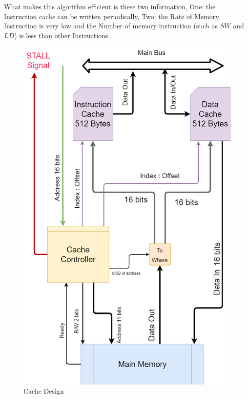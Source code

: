     \vspace{1cm}
    What makes this algorithm efficient is these two information, One: the Instruction cache
    can be written periodically, Two: the Rate of Memory Instruction is very low and the Number
    of memory instruction (such as $SW$ and $LD$) is less than other Instructions.

    \begin{figure}[H]
        \centering
        \includegraphics[width=\textwidth]{images/cache/full_cache_design.png}
        \caption{Cache Design}
        \label{fig:cacheDesign}
    \end{figure}

